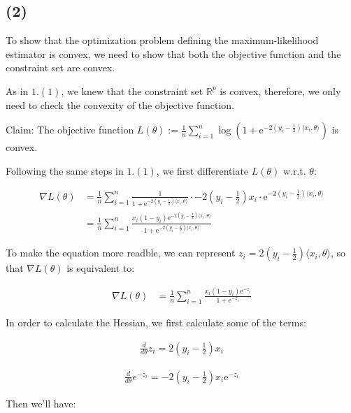 \documentclass{article}
\begin{document}
\subsection*{(2)}

To show that the optimization problem defining the maximum-likelihood estimator is convex,
we need to show that both the objective function and the constraint set are convex.
\bigskip

As in $1.(1)$, we knew that the constraint set $\mathbb{R}^p$ is convex,
therefore, we only need to check the convexity of the objective function.
\bigskip

Claim: The objective function 
$L (\theta) := \frac{1}{n} \sum_{i = 1}^n \log \left( 1 + \mathrm{e}^{-2(y_i - \frac{1}{2})\langle x_i, \theta \rangle} \right)$ is convex.

Following the same steps in $1.(1)$, we first differentiate $L (\theta)$ w.r.t. $\theta$:

\begin{align*}
    \nabla L(\theta) 
    &= \frac{1}{n} \sum_{i = 1}^n \frac{1}{1 + \mathrm{e}^{-2(y_i - \frac{1}{2})\langle x_i, \theta \rangle}} \cdot -2(y_i - \frac{1}{2}) x_i \cdot \mathrm{e}^{-2(y_i - \frac{1}{2})\langle x_i, \theta \rangle} \\
    &= \frac{1}{n} \sum_{i = 1}^n \frac{x_i(1 - y_i)\mathrm{e}^{-2(y_i - \frac{1}{2})\langle x_i, \theta \rangle}}{1 + \mathrm{e}^{-2(y_i - \frac{1}{2})\langle x_i, \theta \rangle}}
\end{align*}

To make the equation more readble, 
we can represent $z_i = 2(y_i - \frac{1}{2})\langle x_i, \theta \rangle$, 
so that $\nabla L(\theta)$ is equivalent to:

\begin{align*}
    \nabla L(\theta) 
    &= \frac{1}{n} \sum_{i = 1}^n \frac{x_i(1 - y_i)\mathrm{e}^{-z_i}}{1 + \mathrm{e}^{-z_i}}
\end{align*}

In order to calculate the Hessian, 
we first calculate some of the terms:

\begin{align*}
    \frac{d}{d\theta} z_i = 2(y_i - \frac{1}{2})x_i
\end{align*}

\begin{align*}
    \frac{d}{d\theta}e^{-z_i} = -2(y_i - \frac{1}{2})x_i\mathrm{e}^{-z_i}
\end{align*}

Then we'll have:
\end{document}
